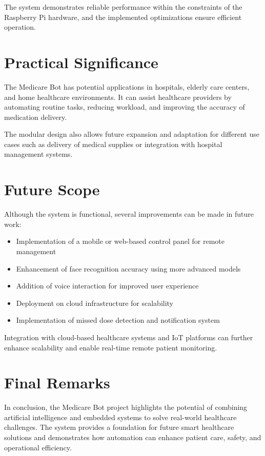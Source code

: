 The system demonstrates reliable performance within the constraints of the Raspberry Pi hardware, and the implemented optimizations ensure efficient operation.

\section{Practical Significance}

The Medicare Bot has potential applications in hospitals, elderly care centers, and home healthcare environments. It can assist healthcare providers by automating routine tasks, reducing workload, and improving the accuracy of medication delivery.

The modular design also allows future expansion and adaptation for different use cases such as delivery of medical supplies or integration with hospital management systems.

\section{Future Scope}

Although the system is functional, several improvements can be made in future work:

\begin{itemize}
    \item Implementation of a mobile or web-based control panel for remote management
    \item Enhancement of face recognition accuracy using more advanced models
    \item Addition of voice interaction for improved user experience
    \item Deployment on cloud infrastructure for scalability
    \item Implementation of missed dose detection and notification system
\end{itemize}

Integration with cloud-based healthcare systems and IoT platforms can further enhance scalability and enable real-time remote patient monitoring.

\section{Final Remarks}

In conclusion, the Medicare Bot project highlights the potential of combining artificial intelligence and embedded systems to solve real-world healthcare challenges. The system provides a foundation for future smart healthcare solutions and demonstrates how automation can enhance patient care, safety, and operational efficiency.